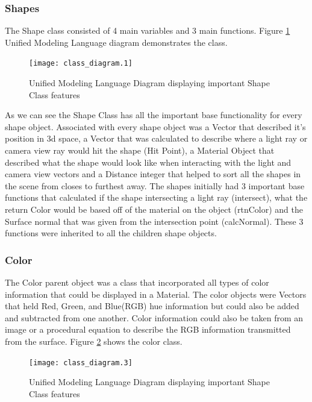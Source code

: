 \subsubsection{Shapes}
The Shape class consisted of 4 main variables and 3 main functions. Figure \ref{uml:shapeclass} Unified Modeling Language diagram demonstrates the class.

\begin{figure}[ht]

\centering
\texttt{[image: class\_diagram.1]}
\caption{Unified Modeling Language Diagram displaying important Shape Class features}
\label{uml:shapeclass}
\end{figure}

As we can see the Shape Class has all the important base functionality for every shape object.  Associated with every shape object was a Vector that described it's position in 3d space, a Vector that was calculated to describe where a light ray or camera view ray would hit the shape (Hit Point), a Material Object that described what the shape would look like when interacting with the light and camera view vectors and a Distance integer that helped to sort all the shapes in the scene from closes to furthest away.  The shapes initially had 3 important base functions that calculated if the shape intersecting a light ray (intersect), what the return Color would be based off of the material on the object (rtnColor) and the Surface normal that was given from the intersection point (calcNormal).  These 3 functions were inherited to all the children shape objects.

\subsubsection{Color}
The Color parent object was a class that incorporated all types of color information that could be displayed in a Material.  The color objects were Vectors that held Red, Green, and Blue(RGB) hue information but could also be added and subtracted from one another.  Color information could also be taken from an image or a procedural equation to describe the RGB information transmitted from the surface. Figure \ref{uml:colorclass} shows the color class.

\begin{figure}[ht]
\centering
\texttt{[image: class\_diagram.3]}
\caption{Unified Modeling Language Diagram displaying important Shape Class features}
\label{uml:colorclass}
\end{figure}

